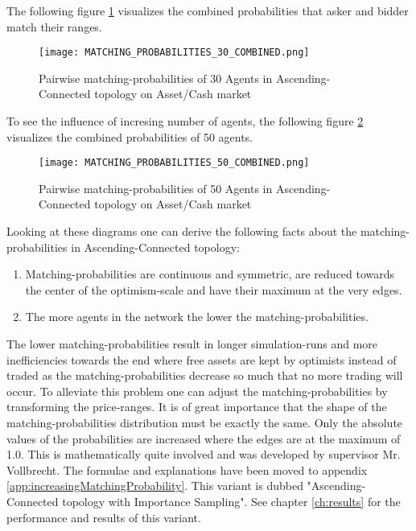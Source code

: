 \documentclass[Bachelorarbeit.tex]{subfiles}
\begin{document}
The following figure \ref{fig:MATCHING_PROBABILITIES_30_COMBINED} visualizes the combined probabilities that asker and bidder match their ranges.

\begin{figure}[H]
	\centering
  \texttt{[image: MATCHING\_PROBABILITIES\_30\_COMBINED.png]}
	\caption{Pairwise matching-probabilities of 30 Agents in Ascending-Connected topology on Asset/Cash market}
	\label{fig:MATCHING_PROBABILITIES_30_COMBINED}
\end{figure}

To see the influence of incresing number of agents, the following figure \ref{fig:MATCHING_PROBABILITIES_50_COMBINED} visualizes the combined probabilities of 50 agents.

\begin{figure}[H]
	\centering
  \texttt{[image: MATCHING\_PROBABILITIES\_50\_COMBINED.png]}
	\caption{Pairwise matching-probabilities of 50 Agents in Ascending-Connected topology on Asset/Cash market}
	\label{fig:MATCHING_PROBABILITIES_50_COMBINED}
\end{figure}

Looking at these diagrams one can derive the following facts about the matching-probabilities in Ascending-Connected topology:
\begin{enumerate}
\item Matching-probabilities are continuous and symmetric, are reduced towards the center of the optimism-scale and have their maximum at the very edges.
\item The more agents in the network the lower the matching-probabilities.
\end{enumerate}

The lower matching-probabilities result in longer simulation-runs and more inefficiencies towards the end where free assets are kept by optimists instead of traded as the matching-probabilities decrease so much that no more trading will occur. To alleviate this problem one can adjust the matching-probabilities by transforming the price-ranges. It is of great importance that the shape of the matching-probabilities distribution must be exactly the same. Only the absolute values of the probabilities are increased where the edges are at the maximum of 1.0. This is mathematically quite involved and was developed by supervisor Mr. Vollbrecht. The formulae and explanations have been moved to appendix \ref{app:increasingMatchingProbability}.
\medskip
This variant is dubbed "Ascending-Connected topology with Importance Sampling". See chapter \ref{ch:results} for the performance and results of this variant.
\end{document}
